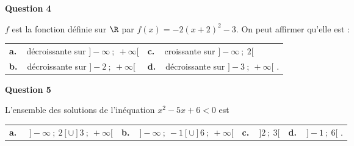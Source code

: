 \medskip

\textbf{Question 4}

\medskip 

$f$ est la fonction définie sur $\R$ par $f(x) = -2(x + 2)^2 - 3$. On peut affirmer qu’elle est :

\medskip

\begin{tabularx}{\linewidth}{*{2}{X}}
\textbf{a.~~}décroissante sur $]-\infty~;~+\infty[$&\textbf{c.~~}croissante sur $]-\infty~;~2[$\\
\textbf{b.~~}décroissante sur $]-2~;~+\infty[$&\textbf{d.~~}décroissante sur $]-3~;~+\infty[$ .\\
\end{tabularx}

\medskip

\textbf{Question  5}

\medskip 

L’ensemble des solutions de l’inéquation $x^2 -5x + 6 < 0 $ est

\medskip

\begin{tabularx}{\linewidth}{*{4}{X}}
\textbf{a.~~} $ ]-\infty~;~2[ \cup ]3~;~+\infty[$ &\textbf{b.~~}$]-\infty~;~-1[ \cup ]6~;~+\infty[ $ &\textbf{c.~~}$]2~;~3[$& \textbf{d.~~}$ ]-1~;~6[$ .
\end{tabularx}

\vspace{0,5cm}
